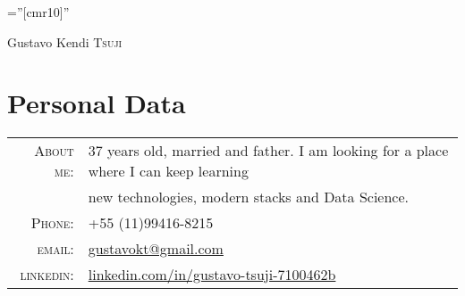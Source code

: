 \documentclass[a4paper,10pt]{article}
\begin{document}

\pagestyle{empty} %

\font\fb=''[cmr10]'' %

\par{\centering
    {\Huge Gustavo Kendi \textsc{Tsuji}
  }\bigskip\par}

\section{Personal Data}

\begin{tabular}{rl}
  \textsc{About me:}   & 37 years old, married and father. I am looking for a place where I can keep learning \\
    &new technologies, modern stacks and Data Science.\\
    \textsc{Phone:}     & +55 (11)99416-8215\\
    \textsc{email:}     & \href{mailto:gustavokt@gmail.com}{gustavokt@gmail.com} \\
    \textsc{linkedin:}     & \href{linkedin.com/in/gustavo-tsuji-7100462b}{linkedin.com/in/gustavo-tsuji-7100462b}
\end{tabular}

\end{document}
